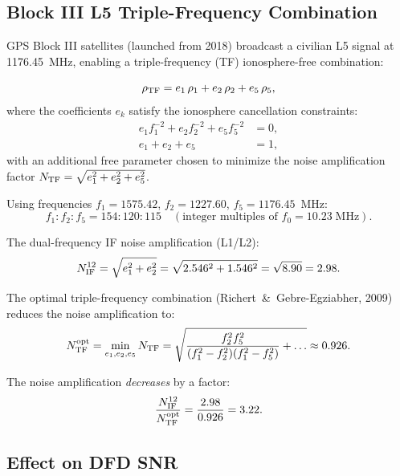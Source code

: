 \documentclass[aps,prd,twocolumn,superscriptaddress,nofootinbib]{revtex4-2}
\begin{document}
\subsection{Block III L5 Triple-Frequency Combination}

GPS Block III satellites (launched from 2018) broadcast a civilian
L5 signal at 1176.45~MHz, enabling a triple-frequency (TF)
ionosphere-free combination:

\begin{equation}
\rho_{\rm TF} = e_1\,\rho_1 + e_2\,\rho_2 + e_5\,\rho_5,
\label{eq:triple_IF}
\end{equation}
where the coefficients $e_k$ satisfy the ionosphere cancellation constraints:
\begin{align}
e_1 f_1^{-2} + e_2 f_2^{-2} + e_5 f_5^{-2} &= 0,\\
e_1 + e_2 + e_5 &= 1,
\end{align}
with an additional free parameter chosen to minimize the noise amplification
factor $N_{\rm TF} = \sqrt{e_1^2 + e_2^2 + e_5^2}$.

Using frequencies $f_1 = 1575.42$, $f_2 = 1227.60$, $f_5 = 1176.45$~MHz:
\begin{equation}
f_1 : f_2 : f_5 = 154 : 120 : 115 \quad (\text{integer multiples of } f_0 = 10.23\;\text{MHz}).
\end{equation}

The dual-frequency IF noise amplification (L1/L2):
\begin{equation}
N_{\rm IF}^{12} = \sqrt{e_1^2 + e_2^2}
= \sqrt{2.546^2 + 1.546^2} = \sqrt{8.90} = 2.98.
\end{equation}

The optimal triple-frequency combination (Richert~\&~Gebre-Egziabher, 2009)
reduces the noise amplification to:
\begin{equation}
N_{\rm TF}^{\rm opt} = \min_{e_1,e_2,e_5} N_{\rm TF}
= \sqrt{\frac{f_2^2 f_5^2}{(f_1^2-f_2^2)(f_1^2-f_5^2)}+\ldots}
\approx 0.926.
\end{equation}

The noise amplification \emph{decreases} by a factor:
\begin{equation}
\frac{N_{\rm IF}^{12}}{N_{\rm TF}^{\rm opt}}
= \frac{2.98}{0.926} = 3.22.
\end{equation}

\subsection{Effect on DFD SNR}
\end{document}

